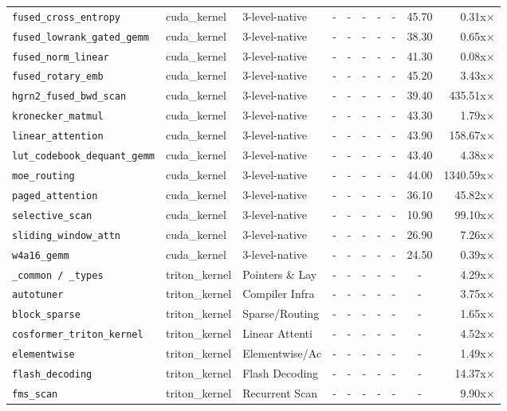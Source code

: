 \begin{center}
\begin{longtable}{lllccccccr}
\texttt{fused\_cross\_entropy} & cuda\_kernel & 3-level-native & - & - & - & - & - & 45.70 & 0.31x$\times$ \\
\texttt{fused\_lowrank\_gated\_gemm} & cuda\_kernel & 3-level-native & - & - & - & - & - & 38.30 & 0.65x$\times$ \\
\texttt{fused\_norm\_linear} & cuda\_kernel & 3-level-native & - & - & - & - & - & 41.30 & 0.08x$\times$ \\
\texttt{fused\_rotary\_emb} & cuda\_kernel & 3-level-native & - & - & - & - & - & 45.20 & 3.43x$\times$ \\
\texttt{hgrn2\_fused\_bwd\_scan} & cuda\_kernel & 3-level-native & - & - & - & - & - & 39.40 & 435.51x$\times$ \\
\texttt{kronecker\_matmul} & cuda\_kernel & 3-level-native & - & - & - & - & - & 43.30 & 1.79x$\times$ \\
\texttt{linear\_attention} & cuda\_kernel & 3-level-native & - & - & - & - & - & 43.90 & 158.67x$\times$ \\
\texttt{lut\_codebook\_dequant\_gemm} & cuda\_kernel & 3-level-native & - & - & - & - & - & 43.40 & 4.38x$\times$ \\
\texttt{moe\_routing} & cuda\_kernel & 3-level-native & - & - & - & - & - & 44.00 & 1340.59x$\times$ \\
\texttt{paged\_attention} & cuda\_kernel & 3-level-native & - & - & - & - & - & 36.10 & 45.82x$\times$ \\
\texttt{selective\_scan} & cuda\_kernel & 3-level-native & - & - & - & - & - & 10.90 & 99.10x$\times$ \\
\texttt{sliding\_window\_attn} & cuda\_kernel & 3-level-native & - & - & - & - & - & 26.90 & 7.26x$\times$ \\
\texttt{w4a16\_gemm} & cuda\_kernel & 3-level-native & - & - & - & - & - & 24.50 & 0.39x$\times$ \\
\texttt{\_common / \_types} & triton\_kernel & Pointers \& Lay & - & - & - & - & - & - & 4.29x$\times$ \\
\texttt{autotuner} & triton\_kernel & Compiler Infra & - & - & - & - & - & - & 3.75x$\times$ \\
\texttt{block\_sparse} & triton\_kernel & Sparse/Routing & - & - & - & - & - & - & 1.65x$\times$ \\
\texttt{cosformer\_triton\_kernel} & triton\_kernel & Linear Attenti & - & - & - & - & - & - & 4.52x$\times$ \\
\texttt{elementwise} & triton\_kernel & Elementwise/Ac & - & - & - & - & - & - & 1.49x$\times$ \\
\texttt{flash\_decoding} & triton\_kernel & Flash Decoding & - & - & - & - & - & - & 14.37x$\times$ \\
\texttt{fms\_scan} & triton\_kernel & Recurrent Scan & - & - & - & - & - & - & 9.90x$\times$ \\
\end{longtable}
\end{center}

